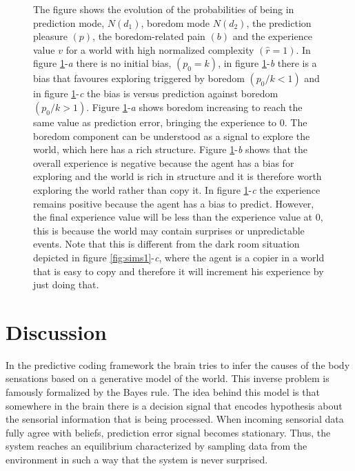 \documentclass[11pt, onecolumn]{article}
\begin{document}
\begin{figure}[H]
    \hfill
    \hfill
    \caption{
The figure shows the evolution of the probabilities of being in prediction mode, $N(d_1)$, boredom mode $N(d_2)$, the prediction pleasure $(p)$, the boredom-related pain $(b)$ and the experience value $v$ for a world with high normalized complexity $(\hat{r} = 1)$. 
In figure \ref{fig:sims2}-\emph{a} there is no initial bias, $(p_0 = k)$, in figure \ref{fig:sims2}-\emph{b} there is a bias that favoures exploring triggered by boredom $(p_0/k < 1)$ and in figure \ref{fig:sims2}-\emph{c} the bias is versus prediction against boredom $(p_0/k > 1)$. Figure \ref{fig:sims2}-\emph{a} shows boredom increasing to reach the same value as prediction error, bringing the experience to 0. The boredom component can be understood as a signal to explore the world, which here has a rich structure. Figure \ref{fig:sims2}-\emph{b} shows that the overall experience is negative because the agent has a bias for exploring and the world is rich in structure and it is therefore worth exploring the world rather than copy it. In figure \ref{fig:sims2}-\emph{c} the experience remains positive because the agent has a bias to predict. However, the final experience value will be less than the experience value at 0, this is because the world may contain surprises or unpredictable events. Note that this is different from the dark room situation depicted in figure \ref{fig:sims1}-\emph{c}, where the agent is a copier in a world that is easy to copy and therefore it will increment his experience by just doing that.}
    \label{fig:sims2}
\end{figure}


\section{Discussion}
\label{se:dis}

In the predictive coding framework the brain tries to infer the causes of the body sensations based on a generative model of the world. This inverse problem is famously formalized by the Bayes rule. The idea behind this model is that somewhere in the brain there is a decision signal that encodes hypothesis about the sensorial information that is being processed. When incoming sensorial data fully agree with beliefs, prediction error signal becomes stationary. Thus, the system reaches an equilibrium characterized by sampling data from the environment in such a way that the system is never surprised.   
\end{document}
